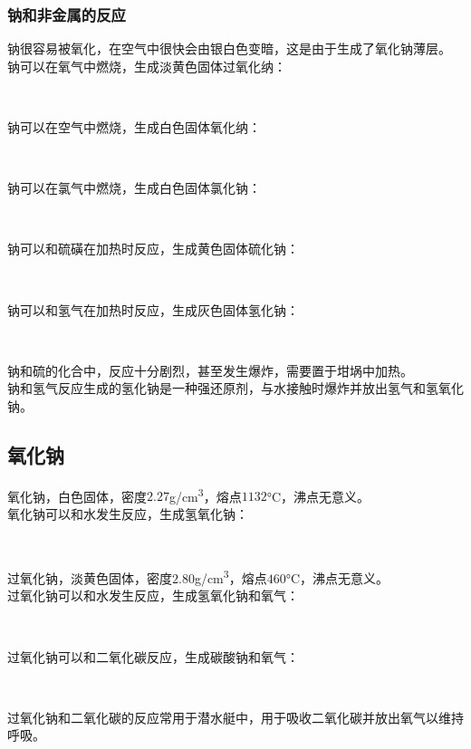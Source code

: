 \documentclass[UTF8]{ctexart}
\begin{document}
\subsubsection{钠和非金属的反应}
    钠很容易被氧化，在空气中很快会由银白色变暗，这是由于生成了氧化钠薄层。\\[3mm]
    钠可以在氧气中燃烧，生成淡黄色固体过氧化纳：
    \begin{center}
        \\[6mm]
    \end{center}
    钠可以在空气中燃烧，生成白色固体氧化纳：
    \begin{center}
        \\[6mm]
    \end{center}
    钠可以在氯气中燃烧，生成白色固体氯化钠：
    \begin{center}
        \\[6mm]
    \end{center}
    钠可以和硫磺在加热时反应，生成黄色固体硫化钠：
    \begin{center}
        \\[6mm]
    \end{center}
    钠可以和氢气在加热时反应，生成灰色固体氢化钠：
    \begin{center}
        \\[6mm]
    \end{center}
    钠和硫的化合中，反应十分剧烈，甚至发生爆炸，需要置于坩埚中加热。\\[3mm]
    钠和氢气反应生成的氢化钠是一种强还原剂，与水接触时爆炸并放出氢气和氢氧化钠。

\newpage

\subsection{氧化钠}
    氧化钠，白色固体，密度$2.27$\si{g/cm^3}，熔点$1132$\si{\degreeCelsius}，沸点无意义。\\[3mm]
    氧化钠可以和水发生反应，生成氢氧化钠：
    \begin{center}
        \\[6mm]
    \end{center}
    过氧化钠，淡黄色固体，密度$2.80$\si{g/cm^3}，熔点$460$\si{\degreeCelsius}，沸点无意义。\\[3mm]
    过氧化钠可以和水发生反应，生成氢氧化钠和氧气：
    \begin{center}
        \\[6mm]
    \end{center}
    过氧化钠可以和二氧化碳反应，生成碳酸钠和氧气：
    \begin{center}
        \\[6mm]
    \end{center}
    过氧化钠和二氧化碳的反应常用于潜水艇中，用于吸收二氧化碳并放出氧气以维持呼吸。
\end{document}
